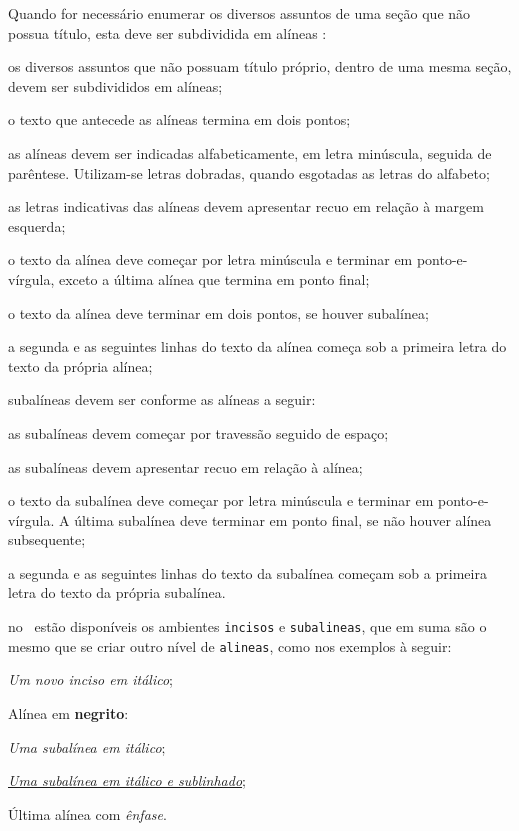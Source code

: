 \documentclass[article,12pt,oneside,a4paper,chapter=TITLE,english,brazil]{abntex2}
\begin{document}
\begin{anexosenv}
Quando for necessário enumerar os diversos assuntos de uma seção que não possua título, esta deve ser subdividida em alíneas \cite[4.2]{NBR6024:2012}:
\begin{alineas}
  \item os diversos assuntos que não possuam título próprio, dentro de uma mesma   seção, devem ser subdivididos em alíneas; 
  \item o texto que antecede as alíneas termina em dois pontos;
  \item as alíneas devem ser indicadas alfabeticamente, em letra minúscula, seguida de parêntese. Utilizam-se letras dobradas, quando esgotadas as letras do alfabeto;
  \item as letras indicativas das alíneas devem apresentar recuo em relação à   margem esquerda;
  \item o texto da alínea deve começar por letra minúscula e terminar em ponto-e-vírgula, exceto a última alínea que termina em ponto final;
  \item o texto da alínea deve terminar em dois pontos, se houver subalínea;
  \item a segunda e as seguintes linhas do texto da alínea começa sob a primeira letra do texto da própria alínea;
  \item subalíneas \cite[4.3]{NBR6024:2012} devem ser conforme as alíneas a seguir:
  \begin{alineas}
     \item as subalíneas devem começar por travessão seguido de espaço;
     \item as subalíneas devem apresentar recuo em relação à alínea;
     \item o texto da subalínea deve começar por letra minúscula e terminar em  ponto-e-vírgula. A última subalínea deve terminar em ponto final, se não houver alínea subsequente;
     \item a segunda e as seguintes linhas do texto da subalínea começam sob a primeira letra do texto da própria subalínea.
  \end{alineas}
  \item no \abnTeX\ estão disponíveis os ambientes \texttt{incisos} e \texttt{subalineas}, que em suma são o mesmo que se criar outro nível de \texttt{alineas}, como nos exemplos à seguir:
  \begin{incisos}
    \item \textit{Um novo inciso em itálico};
  \end{incisos}
  \item Alínea em \textbf{negrito}:
  \begin{subalineas}
    \item \textit{Uma subalínea em itálico};
    \item \underline{\textit{Uma subalínea em itálico e sublinhado}}; 
  \end{subalineas}
  \item Última alínea com \emph{ênfase}.
\end{alineas}



\end{anexosenv}
\end{document}
